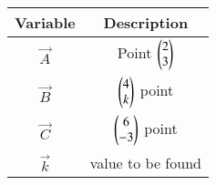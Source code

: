 \begin{tabular}[12pt]{ |c| c|}
    \hline
    \textbf{Variable} & \textbf{Description}\\ 
    \hline
	$\vec{A}$ & Point $\begin{pmatrix}2\\3\end{pmatrix}$\\
    \hline
	$\vec{B}$ & $\begin{pmatrix}4\\k\end{pmatrix}$ point\\
    \hline
	$\vec{C}$ & $\begin{pmatrix}6\\-3\end{pmatrix}$ point\\
    \hline
	$\vec{k}$ & value to be found\\
    \hline
    \end{tabular}
